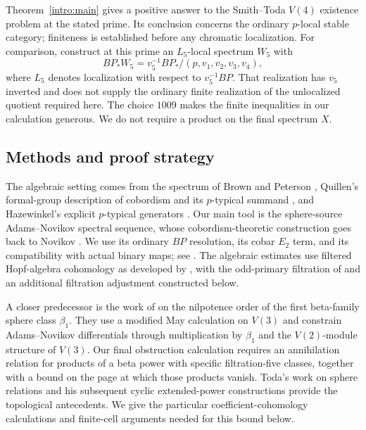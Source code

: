 Theorem~\ref{intro:main} gives a positive answer to the Smith--Toda $V(4)$
existence problem at the stated prime. Its conclusion concerns the ordinary
$p$-local stable category; finiteness is established before any chromatic
localization. For comparison,
\citet[Theorem~1.7]{KatoShimomuraShimomura2025} construct at this prime
an $L_5$-local spectrum $W_5$ with
\[
 BP_*W_5=v_5^{-1}BP_*/(p,v_1,v_2,v_3,v_4),
\]
where $L_5$ denotes localization with respect to $v_5^{-1}BP$.
That realization has $v_5$ inverted and does not supply the ordinary
finite realization of the unlocalized quotient required here.
The choice $1009$ makes the finite inequalities in our calculation
generous. We do not require a product on the final spectrum $X$.

\subsection{Methods and proof strategy}

The algebraic setting comes from the spectrum of Brown and Peterson
\citep{BrownPeterson1966}, Quillen's formal-group description of
cobordism and its $p$-typical summand \citep{Quillen1969}, and
Hazewinkel's explicit $p$-typical generators \citep{HazewinkelIII}.
Our main tool is the sphere-source Adams--Novikov spectral sequence,
whose cobordism-theoretic construction goes back to Novikov
\citep{Novikov1967}. We use its ordinary $BP$ resolution, its cobar
$E_2$ term, and its compatibility with actual binary maps; see
\citet[Sections~2.2--2.3]{Ravenel2004}. The algebraic estimates use
filtered Hopf-algebra cohomology as developed by
\citet[Section~4, Theorem~4]{May1966},
with the odd-primary filtration of
\citet[Theorem~3.2.5]{Ravenel2004} and an additional filtration
adjustment constructed below.

A closer predecessor is the work of
\citet[author preprint, pp.~2--6]{LeeRavenel1994} on the nilpotence
order of the first beta-family sphere class $\beta_1$.
They use a modified May calculation on $V(3)$ and constrain
Adams--Novikov differentials through multiplication by $\beta_1$
and the $V(2)$-module structure of $V(3)$.
Our final obstruction calculation requires an annihilation relation
for products of a beta power with specific filtration-five classes,
together with a bound on the page at which those products vanish.
Toda's work on sphere relations \citep[p.~839, Corollary]{Toda1967}
and his subsequent cyclic extended-power constructions
\citep[Sections~1--3, especially Theorem~3]{Toda1968} provide the
topological antecedents. We give the particular coefficient-cohomology
calculations and finite-cell arguments needed for this bound below.

